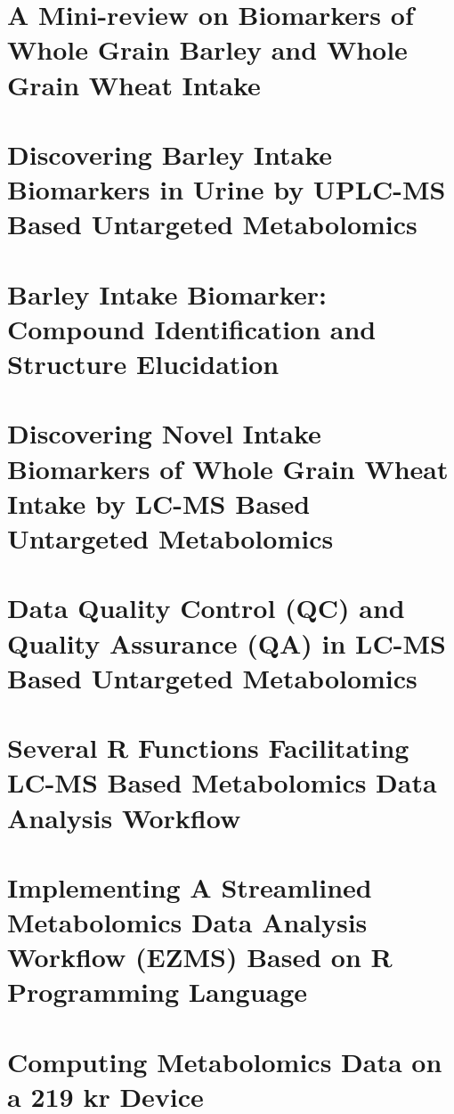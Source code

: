 \documentclass[]{scrreprt}
\begin{document}
%

\chapter{A Mini-review on Biomarkers of Whole Grain Barley and Whole Grain Wheat Intake}
%

\chapter{Discovering Barley Intake Biomarkers in Urine by UPLC-MS Based Untargeted Metabolomics}

\chapter{Barley Intake Biomarker: Compound Identification and Structure Elucidation}

\chapter{Discovering Novel Intake Biomarkers of Whole Grain Wheat Intake by LC-MS Based Untargeted Metabolomics}

\chapter{Data Quality Control (QC) and Quality Assurance (QA) in LC-MS Based Untargeted Metabolomics}


\chapter{Several R Functions Facilitating LC-MS Based Metabolomics Data Analysis Workflow}

\chapter{Implementing A Streamlined Metabolomics Data Analysis Workflow (EZMS) Based on R Programming Language}

\chapter{Computing Metabolomics Data on a 219 kr Device}

\end{document}

